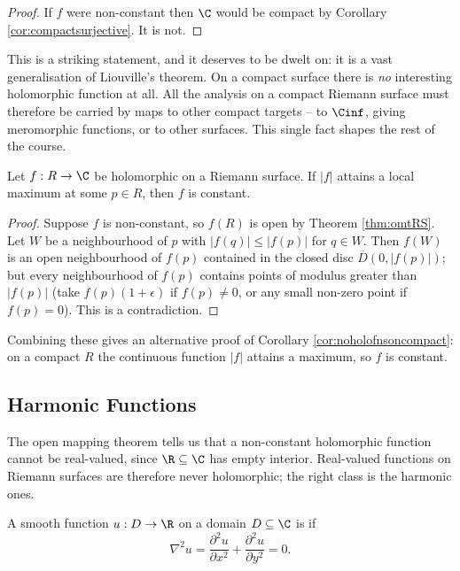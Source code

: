 \begin{proof}
	If $f$ were non-constant then $\C$ would be compact by Corollary
	\ref{cor:compactsurjective}. It is not.
\end{proof}

This is a striking statement, and it deserves to be dwelt on: it is a vast generalisation
of Liouville's theorem. On a compact surface there is \emph{no} interesting holomorphic
function at all. All the analysis on a compact Riemann surface must therefore be carried
by maps to other compact targets -- to $\Cinf$, giving meromorphic functions, or to other
surfaces. This single fact shapes the rest of the course.

\begin{theorem}\label{thm:maxmodRS}
	Let $f : R \to \C$ be holomorphic on a Riemann surface. If $|f|$ attains a local
	maximum at some $p \in R$, then $f$ is constant.
\end{theorem}

\begin{proof}
	Suppose $f$ is non-constant, so $f(R)$ is open by Theorem \ref{thm:omtRS}. Let $W$ be a
	neighbourhood of $p$ with $|f(q)| \le |f(p)|$ for $q \in W$. Then $f(W)$ is an open
	neighbourhood of $f(p)$ contained in the closed disc $\overline{D}(0,|f(p)|)$; but every
	neighbourhood of $f(p)$ contains points of modulus greater than $|f(p)|$ (take
	$f(p)(1 + \epsilon)$ if $f(p) \ne 0$, or any small non-zero point if $f(p) = 0$). This
	is a contradiction.
\end{proof}

Combining these gives an alternative proof of Corollary \ref{cor:noholofnsoncompact}: on a
compact $R$ the continuous function $|f|$ attains a maximum, so $f$ is constant.

\subsection{Harmonic Functions}

The open mapping theorem tells us that a non-constant holomorphic function cannot be
real-valued, since $\R \subseteq \C$ has empty interior. Real-valued functions on Riemann
surfaces are therefore never holomorphic; the right class is the harmonic ones.

\begin{definition}
	A smooth function $u : D \to \R$ on a domain $D \subseteq \C$ is  if
	$$
	\nabla^2 u = \frac{\partial^2 u}{\partial x^2} + \frac{\partial^2 u}{\partial y^2} = 0.
	$$
\end{definition}

